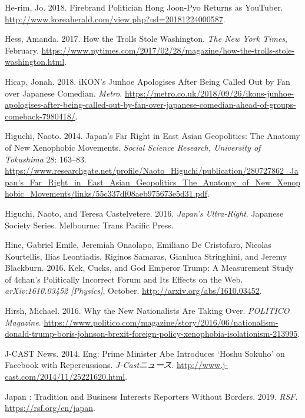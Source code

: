 \documentclass[10pt,british,A4paper,,openany]{memoir}
\begin{document}
\hypertarget{ref-he-rim_firebrand_2018}{}
He-rim, Jo. 2018. Firebrand Politician Hong Joon-Pyo Returns as
YouTuber. \url{http://www.koreaherald.com/view.php?ud=20181224000587}.

\hypertarget{ref-hess_how_2017}{}
Hess, Amanda. 2017. How the Trolls Stole Washington. \emph{The New York
Times}, February.
\url{https://www.nytimes.com/2017/02/28/magazine/how-the-trolls-stole-washington.html}.

\hypertarget{ref-hicap_ikons_2018}{}
Hicap, Jonah. 2018. iKON's Junhoe Apologises After Being Called Out by
Fan over Japanese Comedian. \emph{Metro}.
\url{https://metro.co.uk/2018/09/26/ikons-junhoe-apologises-after-being-called-out-by-fan-over-japanese-comedian-ahead-of-groups-comeback-7980418/}.

\hypertarget{ref-higuchi_japans_2014}{}
Higuchi, Naoto. 2014. Japan's Far Right in East Asian Geopolitics: The
Anatomy of New Xenophobic Movements. \emph{Social Science Research,
University of Tokushima} 28: 163--83.
\url{https://www.researchgate.net/profile/Naoto_Higuchi/publication/280727862_Japan's_Far_Right_in_East_Asian_Geopolitics_The_Anatomy_of_New_Xenophobic_Movements/links/55c337df08aeb975673e5d31.pdf}.

\hypertarget{ref-higuchi_japans_2016}{}
Higuchi, Naoto, and Teresa Castelvetere. 2016. \emph{Japan's
Ultra-Right}. Japanese Society Series. Melbourne: Trans Pacific Press.

\hypertarget{ref-hine_kek_2016}{}
Hine, Gabriel Emile, Jeremiah Onaolapo, Emiliano De Cristofaro, Nicolas
Kourtellis, Ilias Leontiadis, Riginos Samaras, Gianluca Stringhini, and
Jeremy Blackburn. 2016. Kek, Cucks, and God Emperor Trump: A Measurement
Study of 4chan's Politically Incorrect Forum and Its Effects on the Web.
\emph{arXiv:1610.03452 {[}Physics{]}}, October.
\url{http://arxiv.org/abs/1610.03452}.

\hypertarget{ref-hirsh_why_2016}{}
Hirsh, Michael. 2016. Why the New Nationalists Are Taking Over.
\emph{POLITICO Magazine}.
\url{https://www.politico.com/magazine/story/2016/06/nationalism-donald-trump-boris-johnson-brexit-foreign-policy-xenophobia-isolationism-213995}.

\hypertarget{ref-j-cast_news_eng:_2014}{}
J-CAST News. 2014. Eng: Prime Minister Abe Introduces `Hoshu Sokuho' on
Facebook with Repercussions. \emph{J-Castニュース}.
\url{http://www.j-cast.com/2014/11/25221620.html}.

\hypertarget{ref-noauthor_japan_2019}{}
Japan : Tradition and Business Interests Reporters Without Borders.
2019. \emph{RSF}. \url{https://rsf.org/en/japan}.
\end{document}
